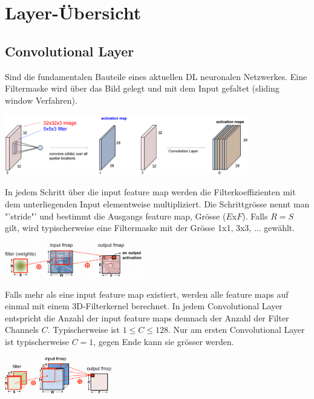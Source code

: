 \section{Layer-Übersicht}
\subsection{Convolutional Layer}
Sind die fundamentalen Bauteile eines aktuellen DL neuronalen Netzwerkes. Eine Filtermaske
wird über das Bild gelegt und mit dem Input gefaltet (sliding window Verfahren). 
\begin{center}
		\includegraphics[width=0.8\textwidth]{../fig/convolutional_layer}
\end{center}
In jedem Schritt über die input feature map werden die Filterkoeffizienten mit dem unterliegenden Input elementweise multipliziert. Die Schrittgrösse nennt man "'stride"' und bestimmt die Ausgangs feature map, Grösse ($E$x$F$). Falls $R=S$ gilt, wird typischerweise eine Filtermaske mit der Grösse 1x1, 3x3, ... gewählt. 
\begin{center}
		\includegraphics[width=0.45\textwidth]{../fig/convolutional_layer_details1}
\end{center}
Falls mehr als eine input feature map existiert, werden alle feature maps auf einmal mit einem 3D-Filterkernel berechnet. In jedem Convolutional Layer entspricht die Anzahl der input feature maps demnach der Anzahl der Filter Channels $C$. Typischerweise ist $1 \leq C \leq 128$. Nur am ersten Convolutional Layer ist typischerweise $C=1$, gegen Ende kann sie grösser werden. 
\vspace{-4mm}
\begin{center}
		\includegraphics[width=0.35\textwidth]{../fig/convolutional_layer_details2}
\end{center}
